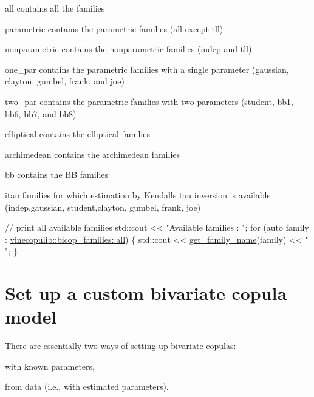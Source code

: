 \begin{DoxyItemize}
\item {\ttfamily all} contains all the families
\item {\ttfamily parametric} contains the parametric families (all except {\ttfamily tll})
\item {\ttfamily nonparametric} contains the nonparametric families ({\ttfamily indep} and {\ttfamily tll})
\item {\ttfamily one\+\_\+par} contains the parametric families with a single parameter ({\ttfamily gaussian}, {\ttfamily clayton}, {\ttfamily gumbel}, {\ttfamily frank}, and {\ttfamily joe})
\item {\ttfamily two\+\_\+par} contains the parametric families with two parameters ({\ttfamily student}, {\ttfamily bb1}, {\ttfamily bb6}, {\ttfamily bb7}, and {\ttfamily bb8})
\item {\ttfamily elliptical} contains the elliptical families
\item {\ttfamily archimedean} contains the archimedean families
\item {\ttfamily bb} contains the BB families
\item {\ttfamily itau} families for which estimation by Kendall\textquotesingle{}s tau inversion is available ({\ttfamily indep},{\ttfamily gaussian}, {\ttfamily student},{\ttfamily clayton}, {\ttfamily gumbel}, {\ttfamily frank}, {\ttfamily joe})
\end{DoxyItemize}


\begin{DoxyCode}
\textcolor{comment}{// print all available families}
std::cout << \textcolor{stringliteral}{"Available families : "};
\textcolor{keywordflow}{for} (\textcolor{keyword}{auto} family : \hyperlink{namespacevinecopulib_1_1bicop__families_a5214a513f41ec23b74782aab96ea6774}{vinecopulib::bicop\_families::all}) \{
        std::cout << \hyperlink{namespacevinecopulib_ac46553ae5f99072f65e9d3254d2c526d}{get\_family\_name}(family) << \textcolor{stringliteral}{" "};
\}
\end{DoxyCode}
\hypertarget{overview-bicop_bicop-custom}{}\section{Set up a custom bivariate copula model}\label{overview-bicop_bicop-custom}
There are essentially two ways of setting-\/up bivariate copulas\+:
\begin{DoxyItemize}
\item with known parameters,
\item from data (i.\+e., with estimated parameters).
\end{DoxyItemize}

